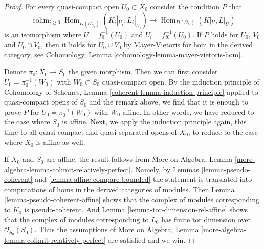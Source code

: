 \documentclass{stacks-project}
\theoremstyle{plain}
\theoremstyle{definition}
\theoremstyle{remark}
\numberwithin{equation}{subsection}
\def\colim{\mathop{\mathrm{colim}}\nolimits}
\def\Hom{\mathop{\mathrm{Hom}}\nolimits}
\begin{document}
\begin{proof}
For every quasi-compact open $U_0 \subset X_0$ consider the
condition $P$ that
$$
\colim_{i \geq 0} \Hom_{D(\mathcal{O}_{U_i})}(K_i|_{U_i}, L_i|_{U_i})
\longrightarrow
\Hom_{D(\mathcal{O}_U)}(K|_U, L|_U)
$$
is an isomorphism where $U = f_0^{-1}(U_0)$ and $U_i = f_{i0}^{-1}(U_0)$.
If $P$ holds for $U_0$, $V_0$ and $U_0 \cap V_0$, then it holds
for $U_0 \cup V_0$ by Mayer-Vietoris
for hom in the derived category, see
Cohomology, Lemma \ref{cohomology-lemma-mayer-vietoris-hom}.

\medskip\noindent
Denote $\pi_0 : X_0 \to S_0$ the given morphism.
Then we can first consider $U_0 = \pi_0^{-1}(W_0)$ with
$W_0 \subset S_0$ quasi-compact open. By the induction principle of
Cohomology of Schemes, Lemma \ref{coherent-lemma-induction-principle}
applied to quasi-compact opens of $S_0$
and the remark above, we find that it is enough to prove
$P$ for $U_0 = \pi_0^{-1}(W_0)$ with $W_0$ affine.
In other words, we have reduced to the case where $S_0$ is affine.
Next, we apply the induction principle again, this time to all
quasi-compact and quasi-separated opens of $X_0$, to reduce to the
case where $X_0$ is affine as well.

\medskip\noindent
If $X_0$ and $S_0$ are affine, the result follows from
More on Algebra, Lemma \ref{more-algebra-lemma-colimit-relatively-perfect}.
Namely, by Lemmas \ref{lemma-pseudo-coherent} and
\ref{lemma-affine-compare-bounded}
the statement is translated into computations of homs in the
derived categories of modules. Then
Lemma \ref{lemma-pseudo-coherent-affine}
shows that the complex of modules corresponding to $K_0$
is pseudo-coherent. And
Lemma \ref{lemma-tor-dimension-rel-affine}
shows that the complex of modules corresponding to $L_0$
has finite tor dimension over $\mathcal{O}_{S_0}(S_0)$.
Thus the assumptions of
More on Algebra, Lemma \ref{more-algebra-lemma-colimit-relatively-perfect}
are satisfied and we win.
\end{proof}
\end{document}
